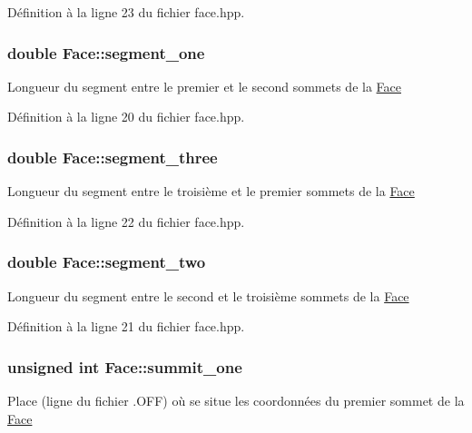 Définition à la ligne 23 du fichier face.\-hpp.

\hypertarget{class_face_ae4053947c53549d2fd5cf43aa9c712f4}{
\subsubsection[{segment\-\_\-one}]{\setlength{\rightskip}{0pt plus 5cm}double Face\-::segment\-\_\-one\hspace{0.3cm}{\ttfamily [private]}}}\label{class_face_ae4053947c53549d2fd5cf43aa9c712f4}
Longueur du segment entre le premier et le second sommets de la \hyperlink{class_face}{Face} 

Définition à la ligne 20 du fichier face.\-hpp.

\hypertarget{class_face_a777ca579978d8d20c6e8a5e64a6999cc}{
\subsubsection[{segment\-\_\-three}]{\setlength{\rightskip}{0pt plus 5cm}double Face\-::segment\-\_\-three\hspace{0.3cm}{\ttfamily [private]}}}\label{class_face_a777ca579978d8d20c6e8a5e64a6999cc}
Longueur du segment entre le troisième et le premier sommets de la \hyperlink{class_face}{Face} 

Définition à la ligne 22 du fichier face.\-hpp.

\hypertarget{class_face_ae79107e53090d0a7efb5070ea093a70e}{
\subsubsection[{segment\-\_\-two}]{\setlength{\rightskip}{0pt plus 5cm}double Face\-::segment\-\_\-two\hspace{0.3cm}{\ttfamily [private]}}}\label{class_face_ae79107e53090d0a7efb5070ea093a70e}
Longueur du segment entre le second et le troisième sommets de la \hyperlink{class_face}{Face} 

Définition à la ligne 21 du fichier face.\-hpp.

\hypertarget{class_face_a68ff25f391cfe3ee5ce2b7f13dac64fa}{
\subsubsection[{summit\-\_\-one}]{\setlength{\rightskip}{0pt plus 5cm}unsigned int Face\-::summit\-\_\-one\hspace{0.3cm}{\ttfamily [private]}}}\label{class_face_a68ff25f391cfe3ee5ce2b7f13dac64fa}
Place (ligne du fichier .O\-F\-F) où se situe les coordonnées du premier sommet de la \hyperlink{class_face}{Face} 

